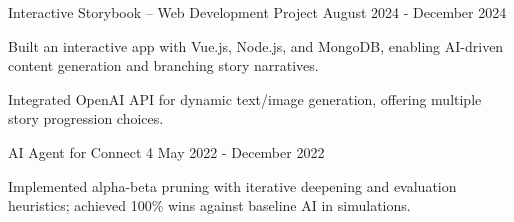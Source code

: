\documentclass[10pt, letterpaper]{article}
\begin{document}
\vspace{\entrySpacing}
\begin{projectentry}
  {Interactive Storybook -- Web Development Project} %
  {August 2024 - December 2024} %
  \item Built an interactive app with Vue.js, Node.js, and MongoDB, enabling AI-driven content generation and branching story narratives.
  \item Integrated OpenAI API for dynamic text/image generation, offering multiple story progression choices.
\end{projectentry}



\vspace{\entrySpacing}
\begin{projectentry}
  {AI Agent for Connect 4} %
  {May 2022 - December 2022} %
  \item Implemented alpha-beta pruning with iterative deepening and evaluation heuristics; achieved 100\% wins against baseline AI in simulations.
\end{projectentry}

\end{document}
